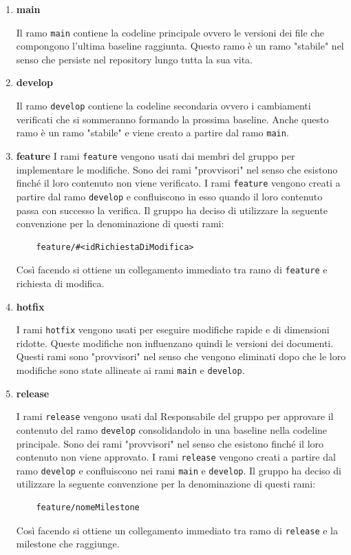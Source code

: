 \begin{enumerate}

\item \textbf{main}

Il ramo \texttt{main} contiene la codeline principale ovvero le versioni dei file che compongono l'ultima baseline raggiunta.
Questo ramo è un ramo "stabile" nel senso che persiste nel repository lungo tutta la sua vita.

\item \textbf{develop}

Il ramo \texttt{develop} contiene la codeline secondaria ovvero i cambiamenti verificati che si sommeranno formando la prossima baseline.
Anche questo ramo è un ramo "stabile" e viene creato a partire dal ramo \texttt{main}.

\item \textbf{feature}
\label{item:rami_feature}
I rami \texttt{feature} vengono usati dai membri del gruppo per implementare le modifiche.
Sono dei rami "provvisori" nel senso che esistono finché il loro contenuto non viene verificato.
I rami \texttt{feature} vengono creati a partire dal ramo \texttt{develop} e confluiscono in esso quando il loro contenuto passa con successo la verifica.
Il gruppo ha deciso di utilizzare la seguente convenzione per la denominazione di questi rami:
\begin{lstlisting}
    feature/#<idRichiestaDiModifica>
\end{lstlisting}
Così facendo si ottiene un collegamento immediato tra ramo di \texttt{feature} e richiesta di modifica.

\item \textbf{hotfix}

I rami \texttt{hotfix} vengono usati per eseguire modifiche rapide e di dimensioni ridotte.
Queste modifiche non influenzano quindi le versioni dei documenti.
Questi rami sono "provvisori" nel senso che vengono eliminati dopo che le loro modifiche sono state allineate ai rami \texttt{main} e \texttt{develop}.


\item \textbf{release}

I rami \texttt{release} vengono usati dal Responsabile del gruppo per approvare il contenuto del ramo \texttt{develop} consolidandolo in una baseline nella codeline principale.
Sono dei rami "provvisori" nel senso che esistono finché il loro contenuto non viene approvato.
I rami \texttt{release} vengono creati a partire dal ramo \texttt{develop} e confluiscono nei rami \texttt{main} e \texttt{develop}.
Il gruppo ha deciso di utilizzare la seguente convenzione per la denominazione di questi rami:
\begin{lstlisting}
    feature/nomeMilestone
\end{lstlisting}
Così facendo si ottiene un collegamento immediato tra ramo di \texttt{release} e la milestone che raggiunge.
\end{enumerate}

